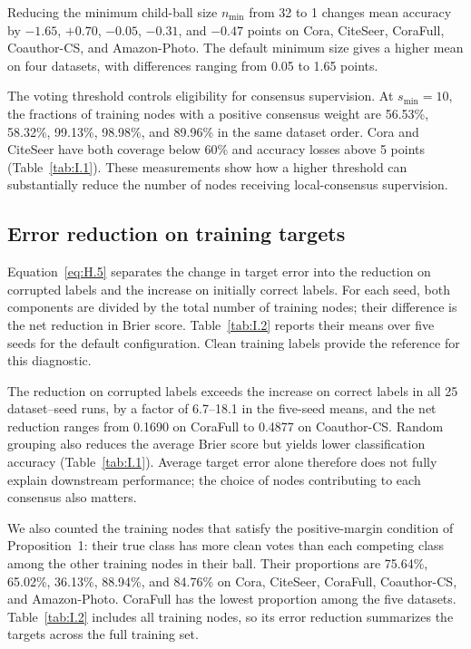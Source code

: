 \documentclass[10pt,letterpaper,nopreprintline]{elsarticle}
\begin{document}
Reducing the minimum child-ball size \(n_{\min}\) from 32 to 1 changes mean accuracy by \(-1.65\), \(+0.70\), \(-0.05\), \(-0.31\), and \(-0.47\) points on Cora, CiteSeer, CoraFull, Coauthor-CS, and Amazon-Photo. The default minimum size gives a higher mean on four datasets, with differences ranging from 0.05 to 1.65 points.

The voting threshold controls eligibility for consensus supervision. At \(s_{\min}=10\), the fractions of training nodes with a positive consensus weight are 56.53\%, 58.32\%, 99.13\%, 98.98\%, and 89.96\% in the same dataset order. Cora and CiteSeer have both coverage below 60\% and accuracy losses above 5 points (Table~\ref{tab:I.1}). These measurements show how a higher threshold can substantially reduce the number of nodes receiving local-consensus supervision.

\subsection{Error reduction on training targets}\label{sec:I.2}

Equation~\eqref{eq:H.5} separates the change in target error into the reduction on corrupted labels and the increase on initially correct labels. For each seed, both components are divided by the total number of training nodes; their difference is the net reduction in Brier score. Table~\ref{tab:I.2} reports their means over five seeds for the default configuration. Clean training labels provide the reference for this diagnostic.



The reduction on corrupted labels exceeds the increase on correct labels in all 25 dataset--seed runs, by a factor of 6.7--18.1 in the five-seed means, and the net reduction ranges from 0.1690 on CoraFull to 0.4877 on Coauthor-CS. Random grouping also reduces the average Brier score but yields lower classification accuracy (Table~\ref{tab:I.1}). Average target error alone therefore does not fully explain downstream performance; the choice of nodes contributing to each consensus also matters.

We also counted the training nodes that satisfy the positive-margin condition of Proposition~1: their true class has more clean votes than each competing class among the other training nodes in their ball. Their proportions are 75.64\%, 65.02\%, 36.13\%, 88.94\%, and 84.76\% on Cora, CiteSeer, CoraFull, Coauthor-CS, and Amazon-Photo. CoraFull has the lowest proportion among the five datasets. Table~\ref{tab:I.2} includes all training nodes, so its error reduction summarizes the targets across the full training set.
\end{document}

